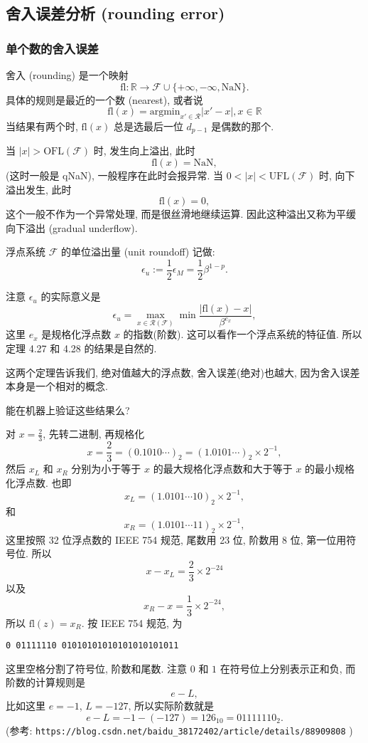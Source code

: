\documentclass[a4paper]{ctexart}
\begin{document}
\subsection{舍入误差分析 (rounding error)}

\subsubsection{单个数的舍入误差}
 舍入 (rounding) 是一个映射
$$
\mbox{fl} : \mathbb{R} \to \mathscr{F} \cup \{+\infty, -\infty, \mbox{NaN}\}.
$$
具体的规则是最近的一个数 (nearest), 或者说
$$
\mbox{fl}(x) = \mbox{argmin}_{x' \in \mathscr{R}} |x' - x|, x \in \mathbb{R}
$$
当结果有两个时, $\mbox{fl}(x)$ 总是选最后一位 $d_{p - 1}$ 是偶数的那个.

 当 $|x| > \mbox{OFL}(\mathscr{F})$ 时, 发生向上溢出, 此时
$$
\mbox{fl}(x) = \mbox{NaN},
$$
(这时一般是 qNaN), 一般程序在此时会报异常. 当 $0 < |x| < \mbox{UFL}(\mathscr{F})$ 时,
向下溢出发生, 此时
$$
\mbox{fl}(x) = 0,
$$
这个一般不作为一个异常处理, 而是很丝滑地继续运算. 因此这种溢出又称为平缓向下溢出
(gradual underflow).

 浮点系统 $\mathscr{F}$ 的单位溢出量 (unit roundoff) 记做:
$$
\epsilon_u := \frac{1}{2}\epsilon_M = \frac{1}{2}\beta^{1 - p}.
$$

注意 $\epsilon_u$ 的实际意义是
$$
\epsilon_u = \max_{x \in \mathscr{R}(\mathscr{F})}\min
\frac{|\mbox{fl}(x) - x|}{\beta^{e_x}},
$$
这里 $e_x$ 是规格化浮点数 $x$ 的指数(阶数). 这可以看作一个浮点系统的特征值.
所以定理 4.27 和 4.28 的结果是自然的.

这两个定理告诉我们, 绝对值越大的浮点数, 舍入误差(绝对)也越大, 
因为舍入误差本身是一个相对的概念.


 能在机器上验证这些结果么?

对 $x = \frac{2}{3}$, 先转二进制, 再规格化
$$
x = \frac{2}{3} = (0.1010\cdots)_2 = (1.0101\cdots)_2 \times 2^{-1},
$$
然后 $x_L$ 和 $x_R$ 分别为小于等于 $x$ 的最大规格化浮点数和大于等于
$x$ 的最小规格化浮点数. 也即
$$
x_L = (1.0101\cdots10)_2 \times 2^{-1},
$$
和
$$
x_R = (1.0101\cdots11)_2 \times 2^{-1},
$$
这里按照 32 位浮点数的 IEEE 754 规范, 尾数用 23 位, 阶数用 8 位, 第一位用符号位.
所以
$$
x - x_L = \frac{2}{3} \times 2^{-24}
$$
以及
$$
x_R - x = \frac{1}{3} \times 2^{-24},
$$
所以 $\mbox{fl}(z) = x_R$. 按 IEEE 754 规范, 为
\begin{verbatim}
0 01111110 01010101010101010101011
\end{verbatim}
这里空格分割了符号位, 阶数和尾数. 注意 $0$ 和 $1$ 在符号位上分别表示正和负,
而阶数的计算规则是
$$
e - L,
$$
比如这里 $e = -1$, $L = -127$, 所以实际阶数就是
$$
e - L = -1 - (-127) = 126_{10} = 01111110_2.
$$
(参考:\newline
\verb|https://blog.csdn.net/baidu_38172402/article/details/88909808|
)
\end{document}
